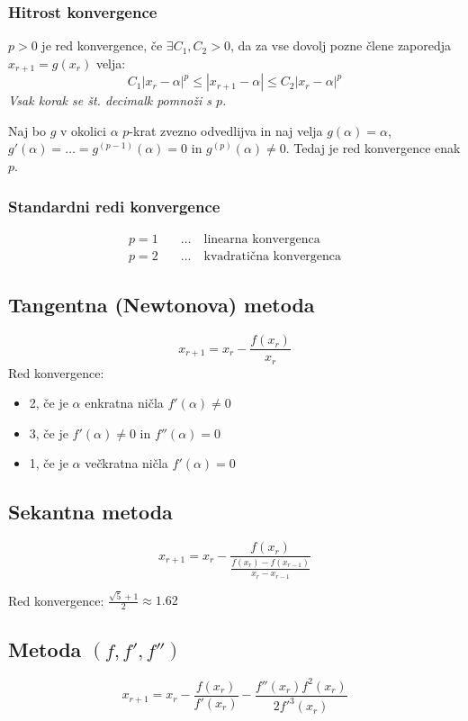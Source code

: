 \begin{multicols}{5}
\subsubsection{Hitrost konvergence}
$p > 0$ je red konvergence, če $\exists C_1, C_2 > 0$, da za vse dovolj pozne člene zaporedja $x_{r+1} = g(x_r)$ velja:
\[ C_1 |x_r - \alpha|^p \leq |x_{r+1} - \alpha| \leq C_2 |x_r - \alpha|^p \]
\textit{Vsak korak se št. decimalk pomnoži s $p$.}

Naj bo $g$ v okolici $\alpha$ $p$-krat zvezno odvedlijva in naj velja 
$g(\alpha) = \alpha$, $g'(\alpha) = \dots = g^{(p-1)}(\alpha) = 0$ in $g^{(p)}(\alpha) \neq 0$.
Tedaj je red konvergence enak $p$.

\subsubsection{Standardni redi konvergence}
\begin{align*}
	p=1 & \quad \dots \quad \text{linearna konvergenca} \\
	p=2 & \quad \dots \quad \text{kvadratična konvergenca}
\end{align*}


\subsection{Tangentna (Newtonova) metoda}
\[ x_{r+1} = x_r - \frac{f(x_r)}{x_r}\]
Red konvergence:
\begin{itemize}
	\item 2, če je $\alpha$ enkratna ničla $f'(\alpha) \neq 0$
	\item 3, če je $f'(\alpha) \neq 0$ in $f''(\alpha) = 0$
	\item 1, če je $\alpha$ večkratna ničla $f'(\alpha) = 0$
\end{itemize}

\subsection{Sekantna metoda}
\[ x_{r+1} = x_r - \frac{f(x_r)}{ \frac{f(x_r)-f(x_{r-1})}{x_r - x_{r-1}} }\]

Red konvergence: $\frac{\sqrt{5}+1}{2} \approx 1.62$

\subsection{Metoda $(f,f',f'')$}
\[ x_{r+1} = x_r - \frac{f(x_r)}{f'(x_r)} - \frac{f''(x_r) f^2(x_r)}{2f'^3(x_r)}\]


\end{multicols}

